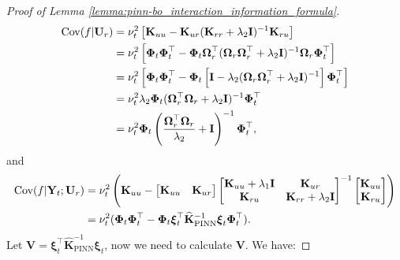 \begin{proof}[Proof of Lemma \ref{lemma:pinn-bo_interaction_information_formula}]
\begin{align}
    \textup{Cov}(f \rvert \mathbf{U}_r) &=  \nu_t^2 \left[ \mathbf{K}_{uu} - \mathbf{K}_{ur}(\mathbf{K}_{rr}+ \lambda_2\mathbf{I})^{-1} \mathbf{K}_{ru} \right] \nonumber
        \\
        &= \nu_t^2 \left[\boldsymbol{\Phi}_t \boldsymbol{\Phi}_t^\top - \boldsymbol{\Phi}_t\boldsymbol{\Omega}_r^\top (\boldsymbol{\Omega}_r\boldsymbol{\Omega}_r^\top + \lambda_2\mathbf{I})^{-1} \boldsymbol{\Omega}_r\boldsymbol{\Phi}_t^\top \right] \nonumber
        \\
        &= \nu_t^2 \left[\boldsymbol{\Phi}_t\boldsymbol{\Phi}_t^\top - \boldsymbol{\Phi}_t\left[\mathbf{I} - \lambda_2(\boldsymbol{\Omega}_r\boldsymbol{\Omega}_r^\top + \lambda_2\mathbf{I})^{-1}\right] \boldsymbol{\Phi}_t^\top \right] \nonumber
        \\
        &= \nu_t^2 \lambda_2 \boldsymbol{\Phi}_t (\boldsymbol{\Omega}_r^\top \boldsymbol{\Omega}_r + \lambda_2\mathbf{I})^{-1} \boldsymbol{\Phi}_t^\top \nonumber 
        \\ 
        &= \nu_t^2 \boldsymbol{\Phi}_t \left(\frac{\boldsymbol{\Omega}_r^\top \boldsymbol{\Omega}_r}{\lambda_2} + \mathbf{I}\right)^{-1} \boldsymbol{\Phi}_t^\top, \label{Eqn:covar_f_condition_on_u}  
\end{align}
and 
\begin{align}
        \textup{Cov}(f \rvert \mathbf{Y}_t; \mathbf{U}_r) &= \nu_t^2 \left(\mathbf{K}_{uu} - \begin{bmatrix}
            \mathbf{K}_{uu} & \mathbf{K}_{ur}
        \end{bmatrix} \begin{bmatrix}
            \mathbf{K}_{uu} + \lambda_1\mathbf{I} & \mathbf{K}_{ur} \\
            \mathbf{K}_{ru} & \mathbf{K}_{rr} + \lambda_2 \mathbf{I}
        \end{bmatrix}^{-1} \begin{bmatrix}
            \mathbf{K}_{uu} \\
            \mathbf{K}_{ru}
        \end{bmatrix} \right)  \nonumber
        \\
        & = \nu_t^2 (\boldsymbol{\Phi}_t \boldsymbol{\Phi}_t^\top - \boldsymbol{\Phi}_t \boldsymbol{\xi}_t^\top \mathbf{\widehat{K}}_\mathrm{PINN}^{-1} \boldsymbol{\xi}_t \boldsymbol{\Phi}_t^\top).  \label{Eqn:covar_f_condition_on_y_and_u}
\end{align}
Let $\mathbf{V} = \boldsymbol{\xi}_t^\top \mathbf{\widehat{K}}_\mathrm{PINN}^{-1} \boldsymbol{\xi}_t$, now we need to calculate $\mathbf{V}$. We have:

\end{proof}

